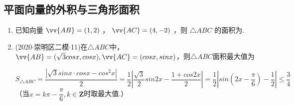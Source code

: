 \subsection*{平面向量的外积与三角形面积}
\begin{enumerate}
    \item 已知向量 $\vv{AB} = \left( {1,2}\right)$ ， $\vv{AC} = \left( {4, - 2}\right)$ ，则 $\bigtriangleup  {ABC}$ 的面积为.
    \item (2020$\cdot$崇明区二模$\cdot$11)在$\triangle ABC$中，$\vv{AB} = (\sqrt{3}cosx, cosx), \vv{AC} = (cosx, sinx)$，则$\triangle ABC$面积最大值为
    \begin{jieda}
        \newline
        $S_{\triangle ABC} = \dfrac{|\sqrt{3}sinx \cdot cosx - cos^2x|}{2} = \dfrac{1}{2}\left| \dfrac{\sqrt{3}}{2}sin2x - \dfrac{1+cos2x}{2}\right| = \dfrac{1}{2} \left | sin(2x-\dfrac{\pi}{6}) - \dfrac{1}{2} \right| \leq \dfrac{3}{4}$\\
        （当$x = k\pi - \dfrac{\pi}{6}, k \in \mathbf{Z}$时取最大值.）
    \end{jieda}
\end{enumerate}

